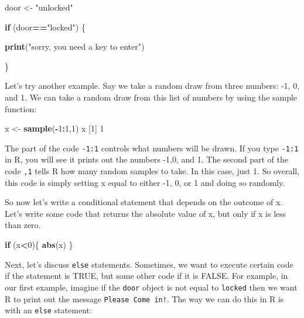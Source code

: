 \documentclass[
]{book}
\newenvironment{Shaded}{\begin{snugshade}}{\end{snugshade}}
\newcommand{\ControlFlowTok}[1]{\textcolor[rgb]{0.13,0.29,0.53}{\textbf{#1}}}
\newcommand{\DecValTok}[1]{\textcolor[rgb]{0.00,0.00,0.81}{#1}}
\newcommand{\FunctionTok}[1]{\textcolor[rgb]{0.13,0.29,0.53}{\textbf{#1}}}
\newcommand{\NormalTok}[1]{#1}
\newcommand{\OtherTok}[1]{\textcolor[rgb]{0.56,0.35,0.01}{#1}}
\newcommand{\SpecialCharTok}[1]{\textcolor[rgb]{0.81,0.36,0.00}{\textbf{#1}}}
\newcommand{\StringTok}[1]{\textcolor[rgb]{0.31,0.60,0.02}{#1}}
\begin{document}
\begin{Shaded}
\begin{Highlighting}[]
\NormalTok{door }\OtherTok{\textless{}{-}} \StringTok{"unlocked"}

\ControlFlowTok{if}\NormalTok{ (door}\SpecialCharTok{==}\StringTok{"locked"}\NormalTok{) \{}
  
  \FunctionTok{print}\NormalTok{(}\StringTok{"sorry, you need a key to enter"}\NormalTok{)}
  
\NormalTok{\}}
\end{Highlighting}
\end{Shaded}

Let's try another example. Say we take a random draw from three numbers: -1, 0, and 1. We can take a random draw from this list of numbers by using the sample function:

\begin{Shaded}
\begin{Highlighting}[]
\NormalTok{x }\OtherTok{\textless{}{-}} \FunctionTok{sample}\NormalTok{(}\SpecialCharTok{{-}}\DecValTok{1}\SpecialCharTok{:}\DecValTok{1}\NormalTok{,}\DecValTok{1}\NormalTok{)}
\NormalTok{x}
\NormalTok{[}\DecValTok{1}\NormalTok{] }\DecValTok{1}
\end{Highlighting}
\end{Shaded}

The part of the code \texttt{-1:1} controls what numbers will be drawn. If you type \texttt{-1:1} in R, you will see it prints out the numbers -1,0, and 1. The second part of the code \texttt{,1} tells R how many random samples to take. In this case, just 1. So overall, this code is simply setting x equal to either -1, 0, or 1 and doing so randomly.

So now let's write a conditional statement that depends on the outcome of x. Let's write some code that returns the absolute value of x, but only if x is less than zero.

\begin{Shaded}
\begin{Highlighting}[]
\ControlFlowTok{if}\NormalTok{ (x}\SpecialCharTok{\textless{}}\DecValTok{0}\NormalTok{)\{}
  \FunctionTok{abs}\NormalTok{(x)}
\NormalTok{\}}
\end{Highlighting}
\end{Shaded}

Next, let's discuss \texttt{else} statements. Sometimes, we want to execute certain code if the statement is TRUE, but some other code if it is FALSE. For example, in our first example, imagine if the \texttt{door} object is not equal to \texttt{locked} then we want R to print out the message \texttt{Please\ Come\ in!}. The way we can do this in R is with an \texttt{else} statement:
\end{document}
